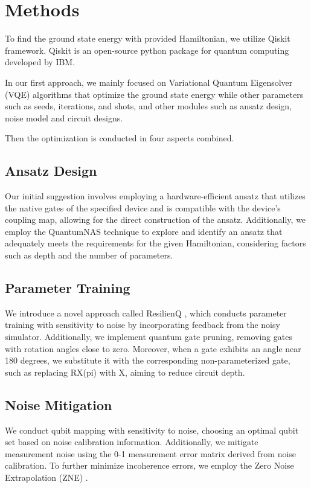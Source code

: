 \documentclass{article}
\begin{document}
\section{Methods}

To find the ground state energy with provided Hamiltonian, we utilize Qiskit framework. Qiskit is an open-source python package for quantum computing developed by IBM. 

In our first approach, we mainly focused on Variational Quantum Eigensolver (VQE) algorithms that optimize the ground state energy while other parameters such as seeds, iterations, and shots, and other modules such as ansatz design, noise model and circuit designs.

Then the optimization is conducted in four aspects combined. 

\subsection{Ansatz Design}
Our initial suggestion involves employing a hardware-efficient ansatz that utilizes the native gates of the specified device and is compatible with the device's coupling map, allowing for the direct construction of the ansatz. Additionally, we employ the QuantumNAS \cite{QuantumNAS2022} technique to explore and identify an ansatz that adequately meets the requirements for the given Hamiltonian, considering factors such as depth and the number of parameters. 

\subsection{Parameter Training}

We introduce a novel approach called ResilienQ \cite{ResilienQ2023}, which conducts parameter training with sensitivity to noise by incorporating feedback from the noisy simulator. Additionally, we implement quantum gate pruning, removing gates with rotation angles close to zero. Moreover, when a gate exhibits an angle near 180 degrees, we substitute it with the corresponding non-parameterized gate, such as replacing RX(pi) with X, aiming to reduce circuit depth.

\subsection{Noise Mitigation}
We conduct qubit mapping with sensitivity to noise, choosing an optimal qubit set based on noise calibration information. Additionally, we mitigate measurement noise using the 0-1 measurement error matrix derived from noise calibration. To further minimize incoherence errors, we employ the Zero Noise Extrapolation (ZNE) \cite{mitiq2022}.
\end{document}
